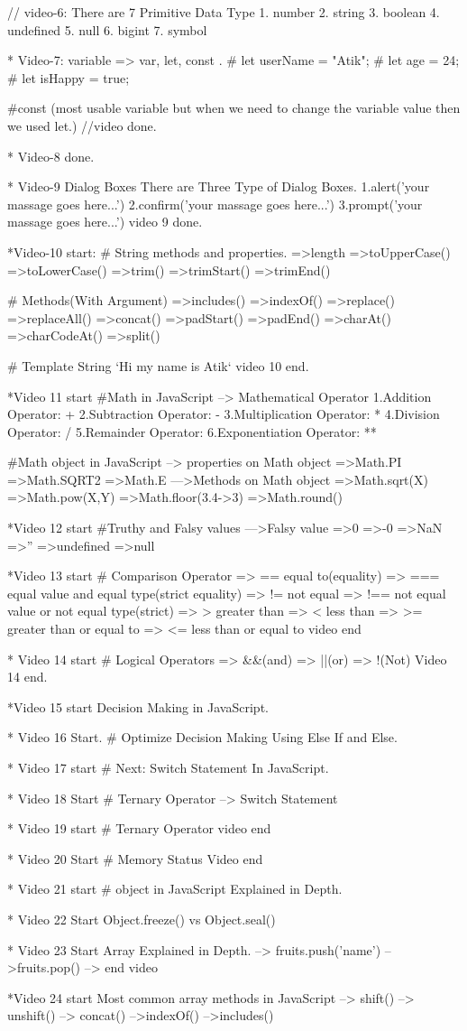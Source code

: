 // video-6: There are 7 Primitive Data Type
1. number
2. string
3. boolean
4. undefined
5. null
6. bigint
7. symbol

* Video-7: 
variable => var, let, const .
# let userName = "Atik";
# let age = 24;
# let isHappy = true;

#const (most usable variable but  when we need to change the variable value then we used let.)
//video done.

* Video-8 done.

* Video-9 
Dialog Boxes
There are Three Type of Dialog Boxes.
1.alert('your massage goes here...')
2.confirm('your massage goes here...')
3.prompt('your massage goes here...')
video 9 done.

*Video-10 start: 
# String methods and properties.
=>length
=>toUpperCase()
=>toLowerCase()
=>trim()
=>trimStart()
=>trimEnd()

# Methods(With Argument)
=>includes()
=>indexOf()
=>replace()
=>replaceAll()
=>concat()
=>padStart()
=>padEnd()
=>charAt()
=>charCodeAt()
=>split()

# Template String 
`Hi my name is Atik`
video 10 end.

*Video 11 start
#Math in JavaScript
--> Mathematical Operator
1.Addition Operator: +
2.Subtraction Operator: -
3.Multiplication Operator: *
4.Division Operator: /
5.Remainder Operator: %
6.Exponentiation Operator: **

#Math object in JavaScript
--> properties on Math object
=>Math.PI 
=>Math.SQRT2
=>Math.E
--->Methods on Math object
=>Math.sqrt(X)
=>Math.pow(X,Y)
=>Math.floor(3.4->3)
=>Math.round()

*Video 12 start
#Truthy and Falsy values
--->Falsy value
=>0
=>-0
=>NaN
=>''
=>undefined
=>null

*Video 13 start
# Comparison Operator
=> == equal to(equality)
=> === equal value and equal type(strict equality)
=> != not equal
=> !== not equal value or not equal type(strict)
=> > greater than
=> < less than
=> >= greater than or equal to 
=> <= less than or equal to
video end

* Video 14 start
# Logical Operators
=> &&(and)
=> ||(or)
=> !(Not)
Video 14 end.

*Video 15 start
Decision Making in JavaScript.

* Video 16 Start.
# Optimize Decision Making Using Else If and Else.

* Video 17 start
# Next: Switch Statement In JavaScript.

* Video 18 Start
# Ternary Operator
--> Switch Statement

* Video 19 start
# Ternary Operator
video end

* Video 20 Start
# Memory Status
 Video end

 * Video 21 start
 # object in JavaScript Explained in Depth.

 * Video 22 Start 
 Object.freeze() vs Object.seal()

 * Video 23 Start
 Array Explained in Depth.
 --> fruits.push('name')
 -->fruits.pop()
 -->
 end video

 *Video 24 start
 Most common array methods in JavaScript
 --> shift()
 --> unshift()
 --> concat()
 -->indexOf()
 -->includes()